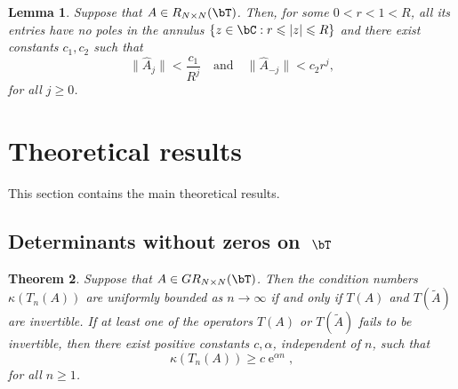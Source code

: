 \documentclass[addpoints,12pt,letter]{article}
\DeclareMathOperator{\e}{e}
\newcommand{\al}{\alpha}
\newcommand{\ka}{\kappa}
\newcommand{\nf}{\infty}
\newcommand{\ti}{\tilde}
\renewcommand{\ge}{\geqslant}
\renewcommand{\le}{\leqslant}
\numberwithin{equation}{section}
\newtheorem{lemma}{Lemma}[section]
\newtheorem{theorem}[lemma]{Theorem}
\theoremstyle{definition}
\begin{document}
\begin{lemma}\label{lm:FourierBound}
Suppose that $A\in R_{N\times N}(\bT)$.
Then, for some $0<r<1<R$, all its entries have no poles in the annulus $\{z\in\bC: r\le|z|\le R\}$ and there exist constants $c_{1},c_{2}$ such that
\[
\|\hat{A}_{j}\|<\frac{c_{1}}{R^{j}}\quad\mbox{and}\quad
\|\hat{A}_{-j}\|<c_{2}r^{j},
\]
for all $j\ge 0$.
\end{lemma}

\section{Theoretical results}\label{sec:main}

This section contains the main theoretical results.

\subsection{Determinants without zeros on~$\bT$}\label{ssec:main1}

\begin{theorem}\label{th:low}
Suppose that $A\in GR_{N\times N}(\bT)$.
Then the condition numbers $\ka(T_{n}(A))$ are uniformly bounded as $n\to\nf$ if and only if $T(A)$ and $T(\ti{A})$ are invertible.
If at least one of the operators $T(A)$ or $T(\ti{A})$ fails to be invertible, then there exist positive constants $c,\al$, independent of $n$, such that
\[
\ka(T_{n}(A))\ge c\e^{\al n},
\]
for all $n\ge 1$.
\end{theorem}
\end{document}
